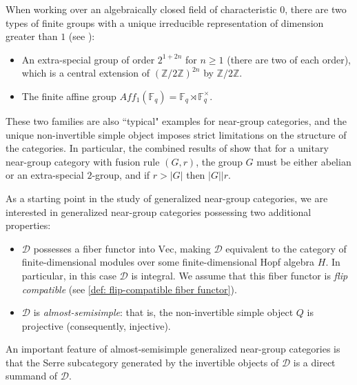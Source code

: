 \documentclass{amsart}
\theoremstyle{plain}%
\theoremstyle{remark}
\newcommand{\1}{\mathbbm{1}}
\newcommand{\D}{\mathcal{D}}
\newcommand{\Z}{\mathbb{Z}}
\newcommand{\Vect}{\mathrm{Vec}}
\begin{document}
    When working over an algebraically closed field of characteristic $0$, there are two types of finite groups with a unique irreducible representation of dimension greater than $1$ (see \cite{Sei}):
    \begin{itemize}
        \item An extra-special group of order $2^{1+2n}$ for $n \geq  1$ (there are two of each order), which is a central extension of $(\Z/2\Z)^{2n}$ by $\Z/2\Z$.
        \item The finite affine group $Aff_1(\mathbb{F}_q)=\mathbb{F}_q\rtimes \mathbb{F}_q^{\times}$.
    \end{itemize}
 
    These two families are also ``typical" examples for near-group categories, and the unique non-invertible simple object imposes strict limitations on the structure of the categories. In particular, the combined results of \cite{EG2, Iz, TY} show that for a unitary near-group category with fusion rule $(G,r)$, the group $G$ must be either abelian or an extra-special $2$-group, and if $r>|G|$ then $|G|\rvert r$.
    
    As a starting point in the study of generalized near-group categories, we are interested in generalized near-group categories possessing two additional properties:
    \begin{itemize}
        \item $\D$ possesses a fiber functor into $\Vect$, making $\D$ equivalent to the category of finite-dimensional modules over some finite-dimensional Hopf algebra $H$. In particular, in this case $\D$ is integral. We assume that this fiber functor is \textit{flip compatible} (see \cref{def: flip-compatible fiber functor}).
        \item $\D$ is {\it almost-semisimple}: that is, the non-invertible simple object $Q$ is projective (consequently, injective).
    \end{itemize}
    An important feature of almost-semisimple generalized near-group categories is that the Serre subcategory generated by the invertible objects of $\D$ is a direct summand of $\D$. 
\end{document}
